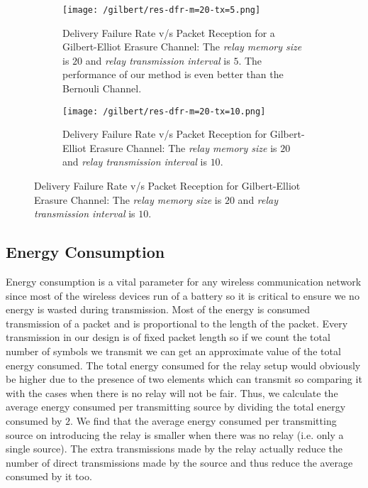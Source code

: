  
\begin{figure}[H]
	\centering
	\vspace{5ex}
	\begin{subfigure}
		\centering
		\texttt{[image: /gilbert/res-dfr-m=20-tx=5.png]}
		\caption{Delivery Failure Rate v/s Packet Reception for a Gilbert-Elliot Erasure Channel: The \textit{relay memory size} is $20$ and \textit{relay transmission interval} is $5$. The performance of our method is even better than the Bernouli Channel.}
		\label{relay-res-3}
	\end{subfigure}

	\vspace{5ex}
	
	\begin{subfigure}[b]
		\centering
		\texttt{[image: /gilbert/res-dfr-m=20-tx=10.png]}
		\caption{Delivery Failure Rate v/s Packet Reception for Gilbert-Elliot Erasure Channel:  The \textit{relay memory size} is $20$ and \textit{relay transmission interval} is $10$.}
		\label{relay-res-4}
	\end{subfigure}
\end{figure}



\subsection{Energy Consumption}

Energy consumption is a vital parameter for any wireless communication network since most of the wireless devices run of a battery so it is critical to ensure we no energy is wasted during transmission. Most of the energy is consumed transmission of a packet and is proportional to the length of the packet.	Every transmission in our design is of fixed packet length so if we count the total number of symbols we transmit we can get an approximate value of the total energy consumed. The total energy consumed for the relay setup would obviously be higher due to the presence of two elements which can transmit so comparing it with the cases when there is no relay will not be fair. Thus, we calculate the average energy consumed per transmitting source by dividing the total energy consumed by $2$. We find that the average energy consumed per transmitting source on introducing the relay is smaller when there was no relay (i.e. only a single source). The extra transmissions made by the relay actually reduce the number of direct transmissions made by the source and thus reduce the average consumed by it too.

